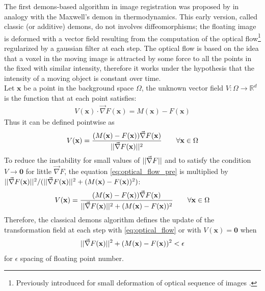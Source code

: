 The first demons-based algorithm in image registration was proposed by \cite{thirion1998image} in analogy with the Maxwell's demon in thermodynamics. This early version, called classic (or additive) demons, do not involves diffeomorphisms; the floating image is deformed with a vector field resulting from the computation of the optical flow\footnote{Previously introduced for small deformation of optical sequence of images \cite{horn1981determining}.} regularized by a gaussian filter at each step. The optical flow is based on the idea that a voxel in the moving image is attracted by some force to all the points in the fixed with similar intensity, therefore it works under the hypothesis that the intensity of a moving object is constant over time. \\
Let $\mathbf{x}$ be a point in the background space $\Omega$, the unknown vector field $V:\Omega \rightarrow \mathbb{R}^{d}$ is the function that at each point satisfies:
\begin{align}\label{eq:optical_flow_initial}
V(\mathbf{x})\cdot \vec{\nabla}F(\mathbf{x}) = M(\mathbf{x}) - F(\mathbf{x})
\end{align}
Thus it can be defined pointwise as
\begin{align}\label{eq:optical_flow_pre}
V(\mathbf{x})
= 
\frac{(M(\mathbf{x}) - F(\mathbf{x}))\vec{\nabla}F(\mathbf{x})}{\vert\lvert \vec{\nabla}F(\mathbf{x}) \rvert\vert^{2}  }
\qquad
\forall \mathbf{x} \in \Omega
\end{align}
To reduce the instability for small values of $\vert\lvert \vec{\nabla}F \rvert\vert$ and to satisfy the condition $V\rightarrow \mathbf{0}$ for little $\vec{\nabla}F$, the equation \ref{eq:optical_flow_pre} is multiplied by $\vert\lvert \vec{\nabla}F(\mathbf{x}) \rvert\vert^{2}  / (\vert\lvert \vec{\nabla}F(\mathbf{x}) \rvert\vert^{2} + (M(\mathbf{x}) - F(\mathbf{x}))^2)$:
\begin{align}\label{eq:optical_flow}
V(\mathbf{x})
= 
\frac{(M(\mathbf{x}) - F(\mathbf{x}))\vec{\nabla}F(\mathbf{x})}{\vert\lvert \vec{\nabla}F(\mathbf{x}) \rvert\vert^{2}  + (M(\mathbf{x}) - F(\mathbf{x}))^2}
\qquad
\forall \mathbf{x} \in \Omega
\end{align}
Therefore, the classical demons algorithm defines the update of the transformation field at each step with \ref{eq:optical_flow} or with $V(\mathbf{x}) = \mathbf{0}$ when 
\begin{align*}
\vert\lvert \vec{\nabla}F(\mathbf{x}) \rvert\vert^{2}  + (M(\mathbf{x}) - F(\mathbf{x}))^2 < \epsilon
\end{align*}
for $\epsilon$ spacing of floating point number.\\

